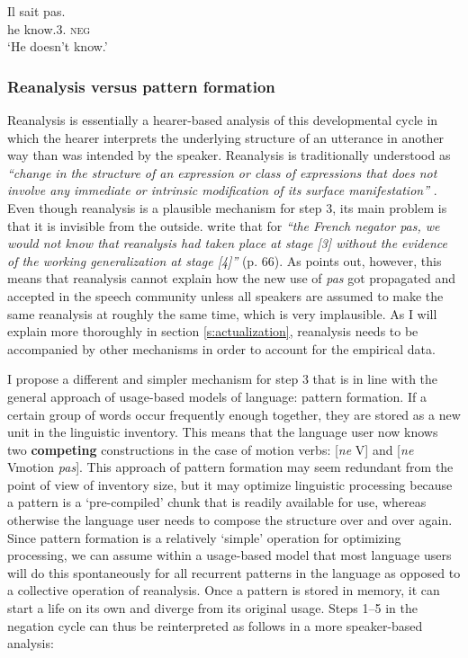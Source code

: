 \ea
\gll Il sait pas.\\
he know.3{\sg}.{\prs} {\textsc{neg}}\\
\glt `He doesn't know.'\\
\z 

\subsubsection{Reanalysis versus pattern formation}
 Reanalysis is essentially a hearer-based analysis of this developmental cycle in which the hearer interprets the underlying structure of an utterance in another way than was intended by the speaker. Reanalysis is traditionally understood as {\em ``change in the structure of an expression or class of expressions that does not involve any immediate or intrinsic modification of its surface manifestation''} \citep[58]{langacker77syntactic}. Even though reanalysis is a plausible mechanism for step 3, its main problem is that it is invisible from the outside. \citet{hopper93grammaticalization} write that for {\em ``the French negator {\em pas}, we would not know that reanalysis had taken place at stage [3] without the evidence of the working generalization at stage [4]''} (p. 66). As \citet{haspelmath98does} points out, however, this means that reanalysis cannot explain how the new use of {\em pas} got propagated and accepted in the speech community unless all speakers are assumed to make the same reanalysis at roughly the same time, which is very implausible. As I will explain more thoroughly in section \ref{s:actualization}, reanalysis needs to be accompanied by other mechanisms in order to account for the empirical data.

I propose a different and simpler mechanism for step 3 that is in line with the general approach of usage-based models of language: pattern formation. If a certain group of words occur frequently enough together, they are stored as a new unit in the linguistic inventory. This means that the language user now knows two {\bfseries competing} constructions in the case of motion verbs: [{\em ne} V] and [{\em ne} Vmotion {\em pas}]. This approach of pattern formation may seem redundant from the point of view of inventory size, but it may optimize linguistic processing because a pattern is a `pre-compiled' chunk that is readily available for use, whereas otherwise the language user needs to compose the structure over and over again. Since pattern formation is a relatively `simple' operation for optimizing processing, we can assume within a usage-based model that most language users will do this spontaneously for all recurrent patterns in the language as opposed to a collective operation of reanalysis. Once a pattern is stored in memory, it can start a life on its own and diverge from its original usage. Steps 1--5 in the negation cycle can thus be reinterpreted as follows in a more speaker-based analysis:


